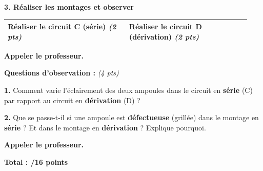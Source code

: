 \documentclass[11pt,a4paper]{article}
\newcommand{\cadreblanc}[1]{%
\medskip\framebox[\linewidth][c]{%
\rule{0mm}{#1mm}}\par
\medskip}
\newcommand{\appelprof}{%
\begin{tcolorbox}[colback=orange!10!white, colframe=orange!80!black]
\textbf{Appeler le professeur.}
\end{tcolorbox}}
\begin{document}
\newpage


\textbf{\large 3. Réaliser les montages et observer}

\vspace{4mm}

\noindent
\begin{tabular}{|p{0.47\linewidth}|p{0.47\linewidth}|}
\hline
\textbf{Réaliser le circuit C (série)} \hfill \textit{(2 pts)} &
\textbf{Réaliser le circuit D (dérivation)} \hfill \textit{(2 pts)} \\
\hline
\end{tabular}

\appelprof

\vspace{5mm}

\textbf{Questions d'observation :} \hfill \textit{(4 pts)}

\vspace{4mm}

\textbf{1.} Comment varie l'éclairement des deux ampoules dans le circuit en \textbf{série} (C) par rapport au circuit en \textbf{dérivation} (D) ?

\cadreblanc{30}

\textbf{2.} Que se passe-t-il si une ampoule est \textbf{défectueuse} (grillée) dans le montage en \textbf{série} ? Et dans le montage en \textbf{dérivation} ? Explique pourquoi.

\cadreblanc{40}

\appelprof

\vspace{5mm}

\begin{center}
  \textbf{\large Total : /16 points}
\end{center}
\end{document}
